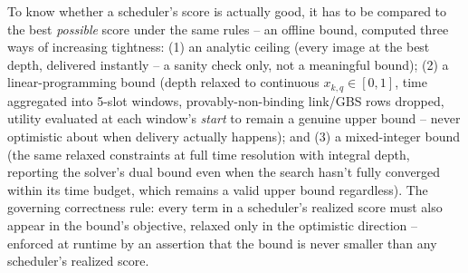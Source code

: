 To know whether a scheduler's score is actually good, it has to be compared to the best \emph{possible} score under the same rules -- an offline bound, computed three ways of increasing tightness: (1) an analytic ceiling (every image at the best depth, delivered instantly -- a sanity check only, not a meaningful bound); (2) a linear-programming bound (depth relaxed to continuous $x_{k,q} \in [0,1]$, time aggregated into 5-slot windows, provably-non-binding link/GBS rows dropped, utility evaluated at each window's \emph{start} to remain a genuine upper bound -- never optimistic about when delivery actually happens); and (3) a mixed-integer bound (the same relaxed constraints at full time resolution with integral depth, reporting the solver's dual bound even when the search hasn't fully converged within its time budget, which remains a valid upper bound regardless). The governing correctness rule: every term in a scheduler's realized score must also appear in the bound's objective, relaxed only in the optimistic direction -- enforced at runtime by an assertion that the bound is never smaller than any scheduler's realized score.
